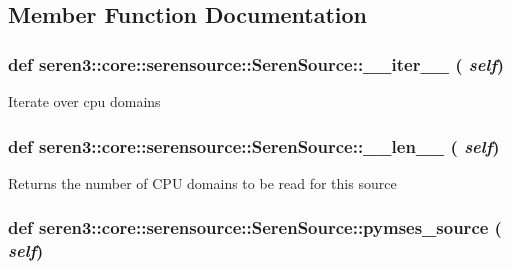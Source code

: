 \subsection{Member Function Documentation}
\hypertarget{classseren3_1_1core_1_1serensource_1_1SerenSource_a6120e621edc47b56093722ef74f9188d}{
\subsubsection[{\_\-\_\-iter\_\-\_\-}]{\setlength{\rightskip}{0pt plus 5cm}def seren3::core::serensource::SerenSource::\_\-\_\-iter\_\-\_\- ( {\em self})}}
\label{classseren3_1_1core_1_1serensource_1_1SerenSource_a6120e621edc47b56093722ef74f9188d}
\begin{DoxyVerb}
Iterate over cpu domains
\end{DoxyVerb}
 \hypertarget{classseren3_1_1core_1_1serensource_1_1SerenSource_a2c076629af25ef6fc19e35d8d0243b16}{
\subsubsection[{\_\-\_\-len\_\-\_\-}]{\setlength{\rightskip}{0pt plus 5cm}def seren3::core::serensource::SerenSource::\_\-\_\-len\_\-\_\- ( {\em self})}}
\label{classseren3_1_1core_1_1serensource_1_1SerenSource_a2c076629af25ef6fc19e35d8d0243b16}
\begin{DoxyVerb}
Returns the number of CPU domains to be read for this source
\end{DoxyVerb}
 \hypertarget{classseren3_1_1core_1_1serensource_1_1SerenSource_ad2b95278d90d79af64d3c84d7add15df}{
\subsubsection[{pymses\_\-source}]{\setlength{\rightskip}{0pt plus 5cm}def seren3::core::serensource::SerenSource::pymses\_\-source ( {\em self})}}
